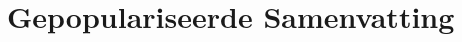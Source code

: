 \chapter{Gepopulariseerde Samenvatting}\label{ch:popabstractnl}

\instructionspopabstract

\makeatletter
{}
\makeatother

\acresetall




\cleardoublepage